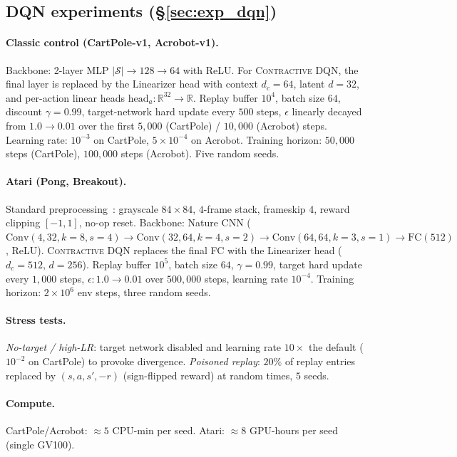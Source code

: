 \documentclass{article}
\newcommand{\R}{\mathbb{R}}
\begin{document}
\subsection{DQN experiments (\S\ref{sec:exp_dqn})}
\label{app:dqn}

\paragraph{Classic control (CartPole-v1, Acrobot-v1).}
Backbone: 2-layer MLP $|\mathcal{S}| \!\to\! 128 \!\to\! 64$ with ReLU.
For \textsc{Contractive DQN}, the final layer is replaced by the Linearizer head with
context $d_c = 64$, latent $d = 32$, and per-action linear heads
$\text{head}_a : \R^{32}\!\to\!\R$.
Replay buffer $10^4$, batch size $64$, discount $\gamma = 0.99$,
target-network hard update every $500$ steps,
$\epsilon$ linearly decayed from $1.0\to 0.01$ over the first $5{,}000$
(CartPole) / $10{,}000$ (Acrobot) steps.
Learning rate: $10^{-3}$ on CartPole, $5\times10^{-4}$ on Acrobot.
Training horizon: $50{,}000$ steps (CartPole), $100{,}000$ steps (Acrobot).
Five random seeds.

\paragraph{Atari (Pong, Breakout).}
Standard preprocessing~\citep{mnih2015human}: grayscale $84\!\times\!84$,
$4$-frame stack, frameskip $4$, reward clipping $[-1,1]$, no-op reset.
Backbone: Nature CNN ($\text{Conv}(4,32,k\!=\!8,s\!=\!4)
\to \text{Conv}(32,64,k\!=\!4,s\!=\!2)
\to \text{Conv}(64,64,k\!=\!3,s\!=\!1) \to \text{FC}(512)$, ReLU).
\textsc{Contractive DQN} replaces the final FC with the Linearizer head
($d_c = 512$, $d = 256$).
Replay buffer $10^5$, batch size $64$, $\gamma = 0.99$, target hard update
every $1{,}000$ steps, $\epsilon: 1.0\to 0.01$ over $500{,}000$ steps,
learning rate $10^{-4}$.
Training horizon: $2 \times 10^6$ env steps, three random seeds.

\paragraph{Stress tests.}
\emph{No-target / high-LR}: target network disabled and learning rate
$10\times$ the default ($10^{-2}$ on CartPole) to provoke divergence.
\emph{Poisoned replay}: $20\%$ of replay entries replaced by
$(s,a,s',-r)$ (sign-flipped reward) at random times, $5$ seeds.

\paragraph{Compute.}
CartPole/Acrobot: $\approx 5$ CPU-min per seed.
Atari: $\approx 8$ GPU-hours per seed (single GV100).
\end{document}
